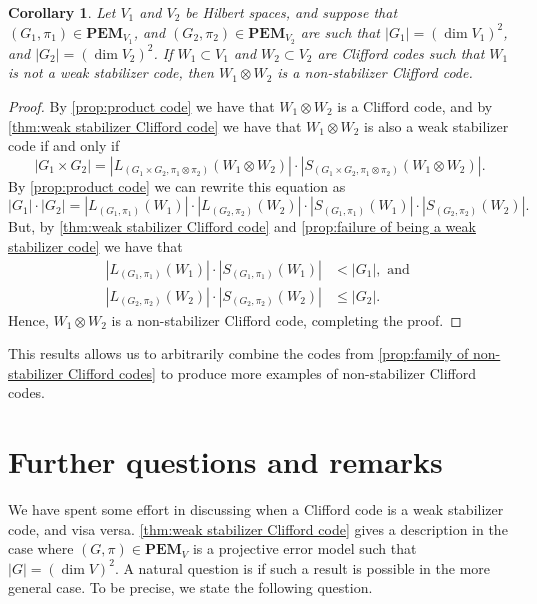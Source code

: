 \documentclass[11pt, oneside, reqno]{amsart}
\newcommand{\PEM}{\mathbf{PEM}}
\theoremstyle{definition}
\theoremstyle{plain}
\newtheorem{corollary}[definition]{Corollary}
\theoremstyle{remark}
\begin{document}
\begin{corollary}\label{cor:non-stabilizer Clifford product code}
    Let $V_1$ and $V_2$ be Hilbert spaces, and suppose that $(G_1,\pi_1) \in \PEM_{V_1}$, and $(G_2,\pi_2) \in \PEM_{V_2}$ are such that $|G_1| = (\dim V_1)^2$, and $|G_2| = (\dim V_2)^2$. If $W_1 \subset V_1$ and $W_2 \subset V_2$ are Clifford codes such that $W_1$ is not a weak stabilizer code, then $W_1 \otimes W_2$ is a non-stabilizer Clifford code.
\end{corollary}
\begin{proof}
    By \cref{prop:product code} we have that $W_1 \otimes W_2$ is a Clifford code, and by \cref{thm:weak stabilizer Clifford code} we have that $W_1 \otimes W_2$ is also a weak stabilizer code if and only if 
    \begin{equation*}
        |G_1 \times G_2| = |L_{(G_1 \times G_2, \pi_1 \otimes \pi_2)}(W_1 \otimes W_2)|\cdot|S_{(G_1 \times G_2, \pi_1 \otimes \pi_2)}(W_1 \otimes W_2)|.
    \end{equation*}
    By \cref{prop:product code} we can rewrite this equation as
    \begin{equation*}
        |G_1|\cdot|G_2| = |L_{(G_1, \pi_1)}(W_1)|\cdot|L_{(G_2, \pi_2)}(W_2)|\cdot|S_{(G_1, \pi_1)}(W_1)|\cdot|S_{(G_2, \pi_2)}(W_2)|.
    \end{equation*}
    But, by \cref{thm:weak stabilizer Clifford code} and \cref{prop:failure of being a weak stabilizer code} we have that
    \begin{align*}
        |L_{(G_1, \pi_1)}(W_1)|\cdot|S_{(G_1, \pi_1)}(W_1)| & < |G_1|, \text{ and } \\
        |L_{(G_2, \pi_2)}(W_2)|\cdot|S_{(G_2, \pi_2)}(W_2)| & \leq |G_2|.
    \end{align*}
    Hence, $W_1 \otimes W_2$ is a non-stabilizer Clifford code, completing the proof.
\end{proof}

This results allows us to arbitrarily combine the codes from \cref{prop:family of non-stabilizer Clifford codes} to produce more examples of non-stabilizer Clifford codes.

\section{Further questions and remarks}\label{sec:further questions}

We have spent some effort in discussing when a Clifford code is a weak stabilizer code, and visa versa. \cref{thm:weak stabilizer Clifford code} gives a description in the case where $(G, \pi) \in \PEM_V$ is a projective error model such that $|G| = (\dim V)^2$. A natural question is if such a result is possible in the more general case. To be precise, we state the following question.
\end{document}
